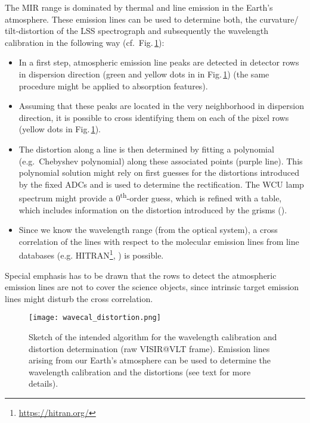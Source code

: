 The MIR range is dominated by thermal and line emission in the Earth's
atmosphere. These emission lines can be used to determine both, the
curvature/ tilt-distortion of the LSS spectrograph and subsequently
the wavelength calibration
in the following way (cf.\ Fig.\,\ref{fig:lm_lss_dist_wave}):\\
\begin{itemize}
\item In a first step, atmospheric emission line peaks are detected in
  detector rows in dispersion direction (green and yellow dots in in
  Fig.\,\ref{fig:lm_lss_dist_wave}) (the same procedure might be
  applied to absorption features).
\item Assuming that these peaks are located in the very neighborhood
  in dispersion direction, it is possible to cross identifying them on
  each of the pixel rows (yellow dots in
  Fig.\,\ref{fig:lm_lss_dist_wave}).
\item The distortion along a line is then determined by fitting a
  polynomial (e.g.\ Chebyshev polynomial) along these associated
  points (purple line).  This polynomial solution might rely on first
  guesses for the distortions introduced by the fixed ADCs and is used
  to determine the rectification. The WCU lamp spectrum might provide
  a 0\textsuperscript{th}-order guess, which is refined with a table,
  which includes information on the distortion introduced by the
  grisms ().
\item Since we know the wavelength range (from the optical system), a
  cross correlation of the lines with respect to the molecular
  emission lines from line databases
  (e.g. HITRAN\footnote{\url{https://hitran.org/}},
  ) is possible.
\end{itemize}
Special emphasis has to be drawn that the rows to detect the
atmospheric emission lines are not
to cover the science objects, since intrinsic target emission lines
might disturb the cross correlation.\\

\begin{figure}[ht]
  \centering
  \texttt{[image: wavecal\_distortion.png]}
  \caption[Algorithm for wavelength calibration and distortion
  determination]{%
    Sketch of the intended algorithm for the wavelength calibration
    and distortion determination (raw VISIR@VLT frame). Emission lines
    arising from our Earth's atmosphere can be used to determine the
    wavelength calibration and the distortions (see text for more
    details).}
  \label{fig:lm_lss_dist_wave}
\end{figure}

